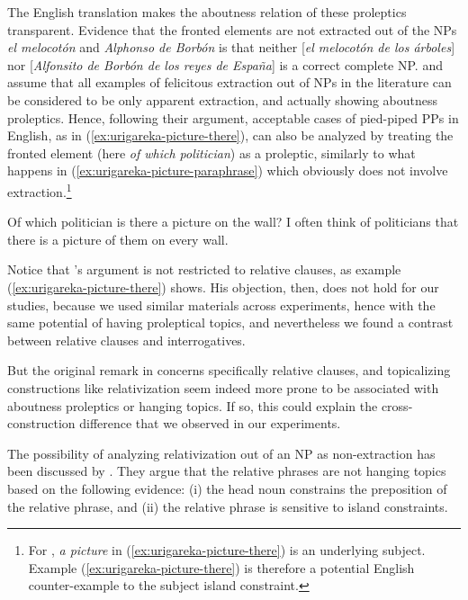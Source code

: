 The English translation makes the aboutness relation of these proleptics transparent. Evidence that the fronted elements are not extracted out of the NPs \emph{el melocotón} and \emph{Alphonso de Borbón} is that neither [\emph{el melocotón de los árboles}] nor [\emph{Alfonsito de Borbón de los reyes de España}] is a correct complete NP. \citeauthor{Uriagereka.2012} and \citeauthor{Jurka.2010} assume that all examples of felicitous extraction out of NPs in the literature can be considered to be only  apparent extraction, and actually showing aboutness proleptics. Hence, following their argument, acceptable cases of pied-piped PPs in English, as in (\ref{ex:urigareka-picture-there}), can also be analyzed by treating the fronted element (here \emph{of which politician}) as a proleptic, similarly to what happens in (\ref{ex:urigareka-picture-paraphrase}) which obviously does not involve extraction.\footnote{For \citet{Uriagereka.2012}, \emph{a picture} in (\ref{ex:urigareka-picture-there}) is an underlying subject. Example (\ref{ex:urigareka-picture-there}) is therefore a potential English counter-example to the subject island constraint.}

\begin{exe}
\ex \citep[95]{Uriagereka.2012}
\begin{xlist}
	\ex Of which politician is there a picture on the wall? \label{ex:urigareka-picture-there}
	\ex I often think of politicians that there is a picture of them on every wall.\label{ex:urigareka-picture-paraphrase}
\end{xlist}
\end{exe}

Notice that \citeauthor{Uriagereka.2012}'s argument is not restricted to relative clauses, as example (\ref{ex:urigareka-picture-there}) shows. His objection, then, does not hold for our studies, because we used similar materials across experiments, hence with the same potential of having proleptical topics, and nevertheless we found a contrast between relative clauses and interrogatives.

But the original remark in \citeauthor{Giorgi.1991} concerns specifically relative clauses, and topicalizing constructions like relativization seem indeed more prone to be associated with aboutness proleptics or hanging topics. If so, this could explain the cross-construction difference that we observed in our experiments.

The possibility of analyzing relativization out of an NP as non-extraction has been discussed by \citet[87--88]{Haegeman.2014}. They argue that the relative phrases are not hanging topics based on the following evidence: (i) the head noun constrains the preposition of the relative phrase, and (ii) the relative phrase is sensitive to island constraints.

